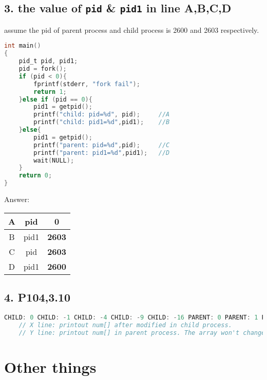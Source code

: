 \documentclass[11pt]{article}
\begin{document}
\subsection*{3. the value of \lstinline{pid} \& \lstinline{pid1} in line A,B,C,D}

assume the pid of parent process and child process is 2600 and 2603 respectively.

    \begin{lstlisting}[language = C]
int main()
{
    pid_t pid, pid1;
    pid = fork();
    if (pid < 0){
        fprintf(stderr, "fork fail");
        return 1;
    }else if (pid == 0){
        pid1 = getpid();
        printf("child: pid=%d", pid);     //A
        printf("child: pid1=%d",pid1);    //B
    }else{
        pid1 = getpid();
        printf("parent: pid=%d",pid);     //C
        printf("parent: pid1=%d",pid1);   //D
        wait(NULL);
    }
    return 0;
}
    \end{lstlisting}

    Answer:
    \begin{table}[H]
        \centering
        \begin{tabular}{|c|c|c|}
            \hline
            A & pid  & \textbf{0}    \\ \hline
            B & pid1 & \textbf{2603} \\ \hline
            C & pid  & \textbf{2603} \\ \hline
            D & pid1 & \textbf{2600} \\ \hline
        \end{tabular}
    \end{table}

\subsection*{4. P104,3.10}

\begin{lstlisting}[language = C]
    CHILD: 0 CHILD: -1 CHILD: -4 CHILD: -9 CHILD: -16 PARENT: 0 PARENT: 1 PARENT: 2 PARENT: 3 PARENT: 4 
    // X line: printout num[] after modified in child process.
    // Y line: printout num[] in parent process. The array won't change with child process because they are seperate in different physical address after fork().
\end{lstlisting}

\section*{Other things}
\end{document}
